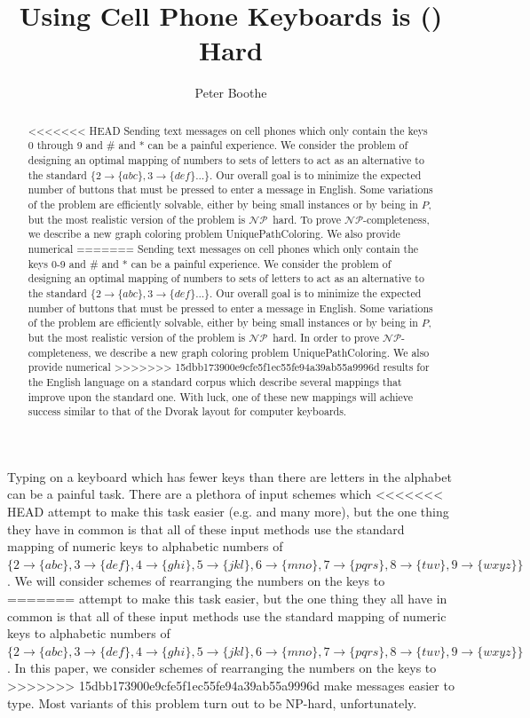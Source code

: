 \documentclass[runningheads]{llncs}
\title{Using Cell Phone Keyboards is (\NP) Hard}
\author{Peter Boothe}
\institute{Manhattan College\\
\email{peter.boothe@manhattan.edu}
}
\newcommand{\NP}{\ensuremath{\mathcal{NP}}}
\begin{document}
\maketitle

\begin{abstract}
<<<<<<< HEAD
Sending text messages on cell phones which only contain the keys 0 through 9
and \# and * can be a painful experience.  We consider the problem of designing
an optimal mapping of numbers to sets of letters to act as an alternative to
the standard $\{2\to\{abc\}, 3\to\{def\}\ldots\}$.  Our overall goal is to
minimize the expected number of buttons that must be pressed to enter a message
in English.  Some variations of the problem are efficiently solvable, either by
being small instances or by being in \ensuremath{P}, but the most realistic
version of the problem is \NP\ hard.  To prove \NP-completeness, we describe a
new graph coloring problem {\sc UniquePathColoring}.  We also provide numerical
=======
Sending text messages on cell phones which only contain the keys 0-9 and \# and
* can be a painful experience.  We consider the problem of designing an optimal
mapping of numbers to sets of letters to act as an alternative to the standard
$\{2\to\{abc\}, 3\to\{def\}\ldots\}$.  Our overall goal is to minimize the
expected number of buttons that must be pressed to enter a message in English.
Some variations of the problem are efficiently solvable, either by being small
instances or by being in \ensuremath{P}, but the most realistic version of the
problem is \NP\ hard.  In order to prove \NP-completeness, we describe a new
graph coloring problem {\sc UniquePathColoring}.  We also provide numerical
>>>>>>> 15dbb173900e9cfe5f1ec55fe94a39ab55a9996d
results for the English language on a standard corpus which describe several
mappings that improve upon the standard one.  With luck, one of these new
mappings will achieve success similar to that of the Dvorak layout for computer
keyboards.
\end{abstract}

Typing on a keyboard which has fewer keys than there are letters in the
alphabet can be a painful task.  There are a plethora of input schemes which
<<<<<<< HEAD
attempt to make this task easier (e.g. \cite{hcimethods,ordering1,godfest} and many more), but the one thing they have in common is
that all of these input methods use the standard mapping of numeric keys to
alphabetic numbers of 
$\{2\to\{abc\}, 3\to\{def\}, 4\to\{ghi\}, 5\to\{jkl\}, 6\to\{mno\}, 7\to\{pqrs\}, 8\to\{tuv\}, 9\to\{wxyz\}\}$.
We will consider schemes of rearranging the numbers on the keys to
=======
attempt to make this task easier, but the one thing they all have in common is
that all of these input methods use the standard mapping of numeric keys to
alphabetic numbers of 
$\{2\to\{abc\},
         3\to\{def\}, 4\to\{ghi\}, 5\to\{jkl\}, 6\to\{mno\}, 7\to\{pqrs\},
         8\to\{tuv\}, 9\to\{wxyz\}\}$.
In this paper, we consider schemes of rearranging the numbers on the keys to
>>>>>>> 15dbb173900e9cfe5f1ec55fe94a39ab55a9996d
make messages easier to type.  Most variants of this problem turn out to be
NP-hard, unfortunately.
\end{document}
